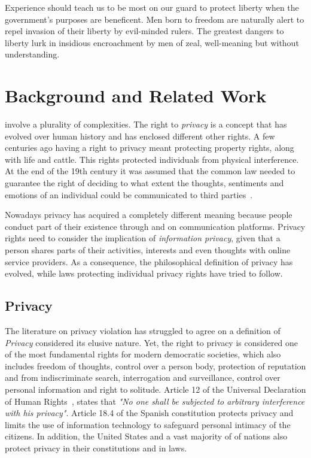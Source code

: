 \begin{savequote}[75mm] 
Experience should teach us to be most on our guard to protect liberty when the government's purposes are beneficent. Men born to freedom are naturally alert to repel invasion of their liberty by evil-minded rulers. The greatest dangers to liberty lurk in insidious encroachment by men of zeal, well-meaning but without understanding.
\end{savequote}

\chapter{Background and Related Work}

 involve a plurality of complexities. The right to \emph{privacy} is a concept that has evolved over human history and has enclosed different other rights. A few centuries ago having a right to privacy meant protecting property rights, along with life and cattle. This rights protected individuals from physical interference. At the end of the 19th century it was assumed that the common law needed to guarantee the right of deciding to what extent the thoughts, sentiments and emotions of an individual could be communicated to third parties~\cite{warren1890right}.

Nowadays privacy has acquired a completely different meaning because people conduct part of their existence through and on communication platforms. Privacy rights need to consider the implication of \emph{information privacy}, given that a person shares parts of their activities, interests and even thoughts with online service providers. As a consequence, the philosophical definition of privacy has evolved, while laws protecting individual privacy rights have tried to follow.

\section{Privacy}
\noindent
The literature on privacy violation has struggled to agree on a definition of \emph{Privacy} considered its elusive nature. Yet, the right to privacy is considered one of the most fundamental rights for modern democratic societies, which also includes freedom of thoughts, control over a person body, protection of reputation and from indiscriminate search, interrogation and surveillance, control over personal information and right to solitude. Article 12 of the Universal Declaration of Human Rights~\cite{assembly1948universal}, states that \emph{"No one shall be subjected to arbitrary interference with his privacy"}. Article 18.4 of the Spanish constitution protects privacy and limits the use of information technology to safeguard personal intimacy of the citizens. In addition, the United States and a vast majority of of nations also protect privacy in their constitutions and in laws. 

